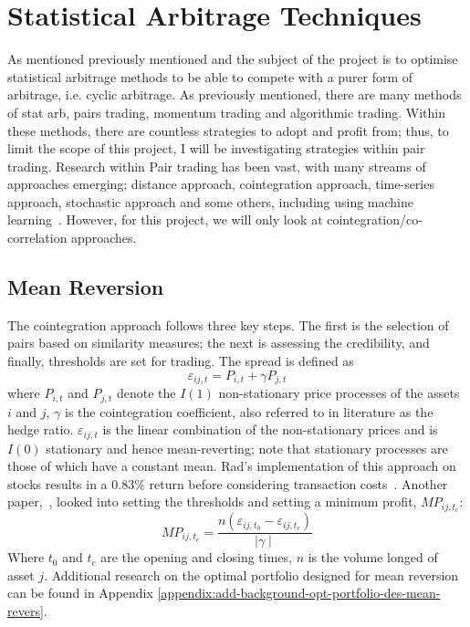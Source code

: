 \section{Statistical Arbitrage Techniques}
As mentioned previously mentioned and the subject of the project is to optimise statistical arbitrage methods to be able to compete with a purer form of arbitrage, i.e. cyclic arbitrage. As previously mentioned, there are many methods of stat arb, pairs trading, momentum trading and algorithmic trading. Within these methods, there are countless strategies to adopt and profit from; thus, to limit the scope of this project, I will be investigating strategies within pair trading. Research within Pair trading has been vast, with many streams of approaches emerging; distance approach, cointegration approach, time-series approach, stochastic approach and some others, including using machine learning~\cite{https://doi.org/10.1111/joes.12153}. However, for this project, we will only look at cointegration/co-correlation approaches.

\subsection{Mean Reversion}
The cointegration approach follows three key steps. The first is the selection of pairs based on similarity measures; the next is assessing the credibility, and finally, thresholds are set for trading. The spread is defined as $$\varepsilon_{i j,t} = P_{i,t} + \gamma P_{j,t}$$ where $P_{i,t}$ and $P_{j,t}$ denote the $I(1)$ non-stationary price processes of the assets $i$ and $j$, $\gamma$ is the cointegration coefficient, also referred to in literature as the hedge ratio. $\varepsilon_{i j,t}$ is the linear combination of the non-stationary prices and is $I(0)$ stationary and hence mean-reverting; note that stationary processes are those of which have a constant mean. Rad's implementation of this approach on stocks results in a 0.83\% return before considering transaction costs~\cite{RadLowFaff}. Another paper,~\cite{lossProtection}, looked into setting the thresholds and setting a minimum profit, $MP_{ij,t_c}$: $$MP_{ij,t_c} = \frac{n(\varepsilon_{i j,t_0} - \varepsilon_{i j,t_c})}{ \mid \gamma \mid}$$ Where $t_0$ and $t_c$ are the opening and closing times, $n$ is the volume longed of asset $j$. Additional research on the optimal portfolio designed for mean reversion can be found in Appendix \ref{appendix:add-background-opt-portfolio-des-mean-revers}.

